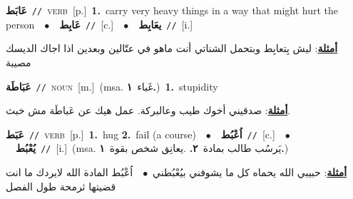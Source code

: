 \documentclass[10pt,a4paper,twoside]{article} %
\begin{document}
\begin{multicols}{2}
{\setlength\topsep{0pt}\textbf{\foreignlanguage{arabic}{عَابَط}}\ {\color{gray}\texttt{//}\color{black}}\ \textsc{verb}\ [p.]\ \textbf{1.}~carry very heavy things in a way that might hurt the person\ \ $\bullet$\ \ \setlength\topsep{0pt}\textbf{\foreignlanguage{arabic}{عَابِط}}\ {\color{gray}\texttt{//}\color{black}}\ [c.]\ \ $\bullet$\ \ \setlength\topsep{0pt}\textbf{\foreignlanguage{arabic}{يعَابِط}}\ {\color{gray}\texttt{//}\color{black}}\ [i.]\  \begin{flushright}\color{gray}\foreignlanguage{arabic}{\textbf{\underline{\foreignlanguage{arabic}{أمثلة}}}: ليش بِتعابِط وبتحمل الشناتي أنت ماهو في عتّالين وبعدين اذا اجاك الديسك مصيبة}\end{flushright}\color{black}} \vspace{2mm}

{\setlength\topsep{0pt}\textbf{\foreignlanguage{arabic}{عَبَاطَة}}\ {\color{gray}\texttt{//}\color{black}}\ \textsc{noun}\ [m.]\ \color{gray}(msa. \foreignlanguage{arabic}{غَباء}~\foreignlanguage{arabic}{\textbf{١.}})\color{black}\ \textbf{1.}~stupidity\  \begin{flushright}\color{gray}\foreignlanguage{arabic}{\textbf{\underline{\foreignlanguage{arabic}{أمثلة}}}: صدقيني أخوك طيب وعالبركة. عمل هيك عن عَباطَة مش خبث.}\end{flushright}\color{black}} \vspace{2mm}

{\setlength\topsep{0pt}\textbf{\foreignlanguage{arabic}{عَبَط}}\ {\color{gray}\texttt{//}\color{black}}\ \textsc{verb}\ [p.]\ \textbf{1.}~hug  \textbf{2.}~fail (a course)\ \ $\bullet$\ \ \setlength\topsep{0pt}\textbf{\foreignlanguage{arabic}{اُعْبُط}}\ {\color{gray}\texttt{//}\color{black}}\ [c.]\ \ $\bullet$\ \ \setlength\topsep{0pt}\textbf{\foreignlanguage{arabic}{يُعْبُط}}\ {\color{gray}\texttt{//}\color{black}}\ [i.]\ \color{gray}(msa. \foreignlanguage{arabic}{يَرسُب طالب بمادة}~\foreignlanguage{arabic}{\textbf{٢.}}  .\foreignlanguage{arabic}{يعانِق شخص بقوة}~\foreignlanguage{arabic}{\textbf{١.}})\color{black}\  \begin{flushright}\color{gray}\foreignlanguage{arabic}{\textbf{\underline{\foreignlanguage{arabic}{أمثلة}}}: حبيبي الله يحماه كل ما يشوفني بيُعْبُطني\ $\bullet$\ \  اُعْبُط المادة الله لايردك ما انت قضيتها ثرمحة طول الفصل}\end{flushright}\color{black}} \vspace{2mm}


\end{multicols}
\end{document}
